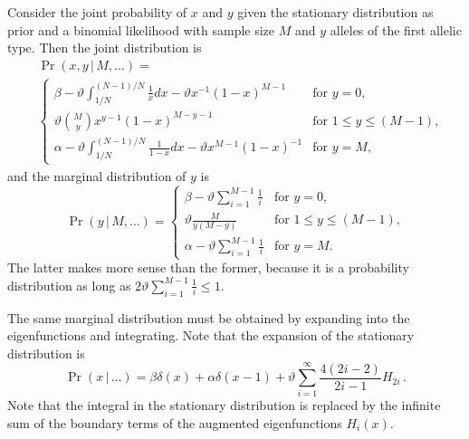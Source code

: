 \documentclass[preprint]{elsarticle}
\newcommand\given{{\,|\,}}
\begin{document}
Consider the joint probability of $x$ and $y$ given the stationary distribution as prior and a binomial likelihood with sample size $M$ and $y$ alleles of the first allelic type. Then the joint distribution is 
\begin{equation}
\begin{split}
     &\Pr(x,y\given M, \dots)=\\
    &\begin{cases}
    \beta-\vartheta\int_{1/N}^{(N-1)/N} \frac{1}{x} dx - \vartheta x^{-1}(1-x)^{M-1} &\text{for $y=0$,}\\
    \vartheta \binom{M}{y}x^{y-1}(1-x)^{M-y-1} &\text{for $1\leq y\leq (M-1)$,}\\
    \alpha-\vartheta\int_{1/N}^{(N-1)/N} \frac{1}{1-x} dx - \vartheta x^{M-1}(1-x)^{-1} &\text{for $y=M$,}
    \end{cases}
   \end{split}
\end{equation}
and the marginal distribution of $y$ is
\begin{equation}\label{eq:marginal_y}
    \Pr(y\given M, \dots)=
    \begin{cases}
    \beta-\vartheta\sum_{i=1}^{M-1} \frac{1}{i} &\text{for $y=0$,}\\
    \vartheta \frac{M}{y(M-y)} &\text{for $1\leq y\leq (M-1)$,}\\
    \alpha-\vartheta\sum_{i=1}^{M-1} \frac{1}{i} &\text{for $y=M$.}
    \end{cases}
\end{equation}
The latter makes more sense than the former, because it is a probability distribution as long as $2\vartheta\sum_{i=1}^{M-1} \frac{1}{i}\leq 1$.

The same marginal distribution must be obtained by expanding into the eigenfunctions and integrating. Note that the expansion of the stationary distribution is
\begin{equation}
\Pr(x\given \dots)=\beta\delta(x)+\alpha\delta(x-1)+\vartheta\sum_{i=1}^{\infty} \frac{4(2i-2)}{2i-1} H_{2i}\,.
\end{equation}
Note that the integral in the stationary distribution is replaced by the infinite sum of the boundary terms of the augmented eigenfunctions $H_i(x)$. 
\end{document}
